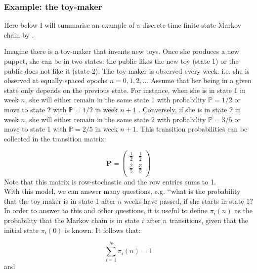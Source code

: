 \documentclass[../main.tex]{subfiles}
\begin{document}
\subsubsection{Example: the toy-maker \citep{Howard1960}}\label{toy-maker1}

Here below I will summarise an example of a discrete-time finite-state Markov chain by \cite{Howard1960}.\\

\begin{small}
Imagine there is a toy-maker that invents new toys. Once she produces a new puppet, she can be in two states: the public likes the new toy (state 1) or the public does not like it (state 2). The toy-maker is observed every week. i.e. she is observed at equally spaced epochs $n = 0, 1,2,..$.
Assume that her being in a given state only depends on the previous state. For instance, when she is in state 1 in week $n$, she will either remain in the same state 1 with probability $\mathds{P} = 1/2$ or move to state 2 with $\mathds{P} = 1/2$ in week $n+1$  . Conversely, if she is in state 2 in week $n$, she will either remain in the same state 2 with probability $\mathds{P} = 3/5$ or move to state 1 with $\mathds{P} = 2/5$ in week $n+1$. This transition probabilities can be collected in the transition matrix:


\begin{equation*}
\mathbf{P} =
\begin{pmatrix}
\frac{1}{2} &  \frac{1}{2}\\
\frac{2}{5} &  \frac{3}{5}\\
\end{pmatrix}
\end{equation*}
Note that this matrix is row-stochastic and the row entries sums to 1.\\

With this model, we can answer many questions, e.g. \lq\lq what is the probability that the toy-maker is in state 1 after $n$ weeks have passed, if she starts in state 1?\\

In order to answer to this and other questions, it is useful to define $\pi_i(n)$ as the probability that the Markov chain is in state $i$ after $n$ transitions, given that the initial state $\pi_i(0)$ is known. It follows that:

\begin{equation}
    \sum_{i=1}^{N} \pi_i(n) = 1
\end{equation}
and 


\end{small}
\end{document}
